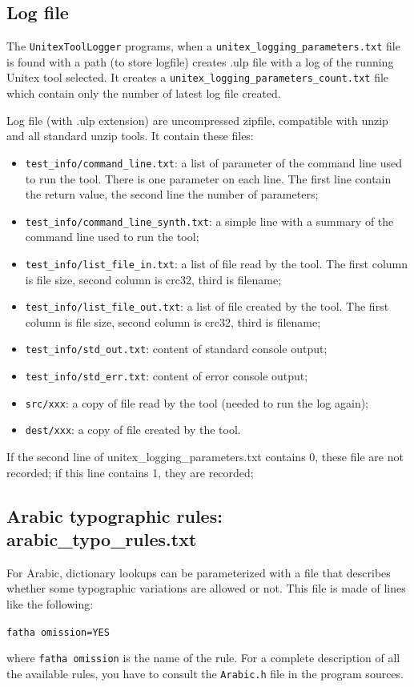 \subsection{Log file}
 \label{section-log-file}
The \verb+UnitexToolLogger+ programs, when a \verb+unitex_logging_parameters.txt+ file
is found with a path (to store logfile) creates .ulp file with a log of the running
Unitex tool selected.
It creates a \verb+unitex_logging_parameters_count.txt+ file which contain only the number
of latest log file created.

Log file (with .ulp extension) are uncompressed zipfile, compatible with unzip and
all standard unzip tools. It contain these files:
\begin{itemize}
  \item \verb+test_info/command_line.txt+: a list of parameter of the
command line used to run the tool. There is one parameter on each line. The first line
contain the return value, the second line the number of parameters;

  \item \verb+test_info/command_line_synth.txt+: a simple line with a summary of the
command line used to run the tool;

  \item \verb+test_info/list_file_in.txt+: a list of file read by the tool.
  The first column is file size, second column is crc32, third is filename;

  \item \verb+test_info/list_file_out.txt+: a list of file created by the tool.
  The first column is file size, second column is crc32, third is filename;

  \item \verb+test_info/std_out.txt+: content of standard console output;

  \item \verb+test_info/std_err.txt+: content of error console output;

  \item \verb+src/xxx+: a copy of file read by the tool (needed to run the log again);

  \item \verb+dest/xxx+: a copy of file created by the tool.
\end{itemize}

If the second line of unitex\_logging\_parameters.txt contains 0, these file are not recorded;
if this line contains 1, they are recorded;

\subsection{Arabic typographic rules: arabic\_typo\_rules.txt}
\label{subsection-arabic-typo-rules}
For Arabic, dictionary lookups can be parameterized with a file that describes whether some typographic 
variations are allowed or not. This file is made of lines like the following:

\bigskip
\noindent \verb+fatha omission=YES+

\bigskip
\noindent where \verb+fatha omission+ is the name of the rule. For a complete description of all the
available rules, you have to consult the \verb+Arabic.h+ file in the program sources.
